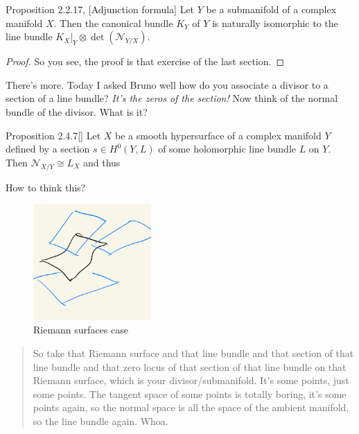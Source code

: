 \begin{thing4}{Proposition 2.2.17, \cite{huc}}[Adjunction formula]\label{prop:2.2.17}\leavevmode
Let \(Y\) be a submanifold of a complex manifold \(X\). Then the canonical bundle \(K_Y\) of \(Y\) is naturally isomorphic to the line bundle \(K_X|_{Y} \otimes \det(\mathcal{N}_{Y/X})\).
\end{thing4}

\begin{proof}\leavevmode
So you see, the proof is that exercise of the last section.
\end{proof}

There's more. Today I asked Bruno well how do you associate a divisor to a section of a line bundle? \textit{It's the zeros of the section!} Now think of the normal bundle of the divisor. What is it?
\begin{thing4}{Proposition 2.4.7}[\cite{huc}]\label{prop:2.4.7}\leavevmode
Let \(X\) be a smooth hypersurface of a complex manifold \(Y\) defined by a section \(s \in H^{0}(Y,L)\) of some holomorphic line bundle \(L\) on \(Y\). Then \(\mathcal{N}_{X/Y}\cong L_X\) and thus 
\end{thing4}

How to think this?

\begin{figure}[H]
	\centering
	\includegraphics[width=0.4\textwidth]{fig1}
	\caption*{Riemann surfaces case}
\end{figure}
 \begin{quotation}
 	So take that Riemann surface and that line bundle and that section of that line bundle and that zero locus of that section of that line bundle on that Riemann surface, which is your divisor/submanifold. It's some points, just some points. The tangent space of some points is totally boring, it's some points again, so the normal space is all the space of the ambient manifold, so the line bundle again. Whoa.
 \end{quotation}

